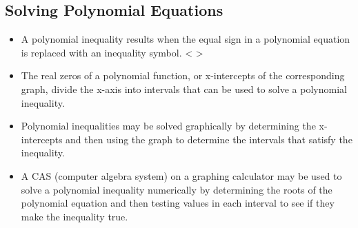 \documentclass{article}
\begin{document}
\subsection{Solving Polynomial Equations}
\begin{itemize}
    \item A polynomial inequality results when the equal sign in a polynomial equation is replaced
with an inequality symbol. < >
    \item The real zeros of a polynomial function, or x-intercepts of the corresponding graph, divide
the x-axis into intervals that can be used to solve a polynomial inequality.
    \item Polynomial inequalities may be solved graphically by determining the x-intercepts and
then using the graph to determine the intervals that satisfy the inequality.
    \item A CAS (computer algebra system) on a graphing calculator may be used to solve a polynomial inequality numerically by determining the roots of the polynomial equation and then testing values in each interval to see if they make the inequality true.
\end{itemize}
\end{document}

